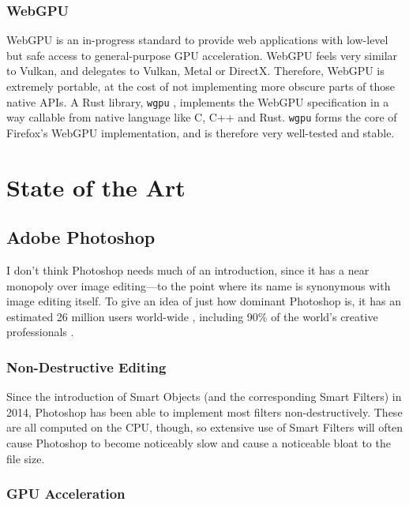 \documentclass[12pt]{article}
\begin{document}
\subsubsection{WebGPU}\label{sec:wgpu}

WebGPU \cite{webgpu} is an in-progress standard to provide web applications with low-level but safe
access to general-purpose GPU acceleration.  WebGPU feels very similar to Vulkan, and delegates to
Vulkan, Metal or DirectX.  Therefore, WebGPU is extremely portable, at the cost of not implementing
more obscure parts of those native APIs.  A Rust library, \verb|wgpu| \cite{wgpu}, implements the
WebGPU specification in a way callable from native language like C, C++ and Rust.  \verb|wgpu| forms
the core of Firefox's WebGPU implementation, and is therefore very well-tested and stable.



\pagebreak

\section{State of the Art}\label{sec:existing-editors}

\subsection{Adobe Photoshop}

I don't think Photoshop needs much of an introduction, since it has a near monopoly over image
editing---to the point where its name is synonymous with image editing itself.  To give an idea of
just how dominant Photoshop is, it has an estimated 26 million users
world-wide \cite{photoshop-users}, including
90\% of the world's creative
professionals \cite{adobe-facts}.

\subsubsection{Non-Destructive Editing}

Since the introduction of Smart Objects \cite{smart-obj} (and the corresponding Smart Filters) in
2014, Photoshop has been able to implement most filters non-destructively.  These are all computed
on the CPU, though, so extensive use of Smart Filters will often cause Photoshop to become
noticeably slow and cause a noticeable bloat to the file size.

\subsubsection{GPU Acceleration}
\end{document}
